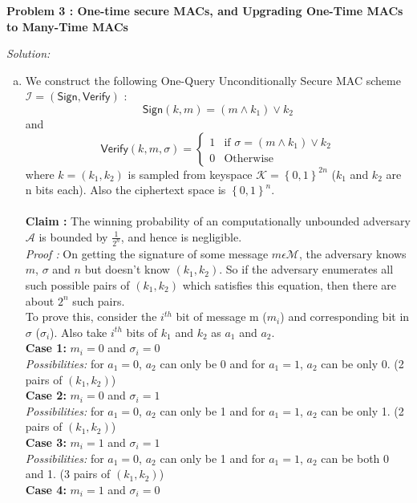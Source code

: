 \documentclass[a4paper, 11pt]{article}
\newenvironment{solution}
    {\textit{Solution:}}
    {\clearpage}
\newcommand{\prob}[1]{\begin{mdframed}[backgroundcolor=gray!20] \textbf{Problem #1}\end{mdframed}}
\newcommand{\bit}{\left\{0, 1\right\}}
\newcommand{\sign}{\mathsf{Sign}}
\newcommand{\verif}{\mathsf{Verify}}
\newcommand{\calA}{\mathcal{A}}
\newcommand{\calI}{\mathcal{I}}
\newcommand{\calK}{\mathcal{K}}
\newcommand{\calM}{\mathcal{M}}
\begin{document}
\prob{3 : One-time secure MACs, and Upgrading One-Time MACs to Many-Time MACs}
\begin{solution}
    \begin{enumerate}[(a)]
        \item We construct the following One-Query Unconditionally Secure MAC scheme $\calI = (\sign, \verif)$ : 
        $$\sign(k, m) = (m \wedge k_1) \vee k_2$$ and 
        $$\verif(k, m, \sigma) = \begin{cases}
                      1 & \text{if } \sigma =  (m \wedge k_1) \vee k_2\\
                      0 & \text{Otherwise}
              \end{cases}$$
        where $k = (k_1, k_2)$ is sampled from keyspace $\calK = \bit^{2n}$ ($k_1$ and $k_2$ are n bits each). Also the ciphertext space is $\bit^n$. \\ \\ 
        \textbf{Claim :} The winning probability of an computationally unbounded adversary $\calA$ is bounded by $\frac{1}{2^n}$, and hence is negligible. \\
        \textit{Proof :} On getting the signature of some message $m \epsilon \calM$, the adversary knows $m$, $\sigma$ and $n$ but doesn't know $(k_1, k_2)$. So if the adversary enumerates all such possible pairs of $(k_1, k_2)$ which satisfies this equation, then there are about $2^n$ such pairs. \\ 
        To prove this, consider the $i^{th}$ bit of message m ($m_i$) and corresponding bit in $\sigma$ ($\sigma_i$). Also take $i^{th}$ bits of $k_1$ and $k_2$ as $a_1$ and $a_2$. \\
        \textbf{Case 1:} $m_i = 0$ and $\sigma_i = 0$ \\
        \textit{Possibilities:} for $a_1 = 0$, $a_2$ can only be 0 and for $a_1 = 1$, $a_2$ can be only 0. (2 pairs of $(k_1, k_2)$)\\
        \textbf{Case 2:} $m_i = 0$ and $\sigma_i = 1$ \\
        \textit{Possibilities:} for $a_1 = 0$, $a_2$ can only be 1 and for $a_1 = 1$, $a_2$ can be only 1. (2 pairs of $(k_1, k_2)$)\\
        \textbf{Case 3:} $m_i = 1$ and $\sigma_i = 1$ \\
        \textit{Possibilities:} for $a_1 = 0$, $a_2$ can only be 1 and for $a_1 = 1$, $a_2$ can be both 0 and 1. (3 pairs of $(k_1, k_2)$)\\
        \textbf{Case 4:} $m_i = 1$ and $\sigma_i = 0$ \\

\end{enumerate}
\end{solution}
\end{document}

